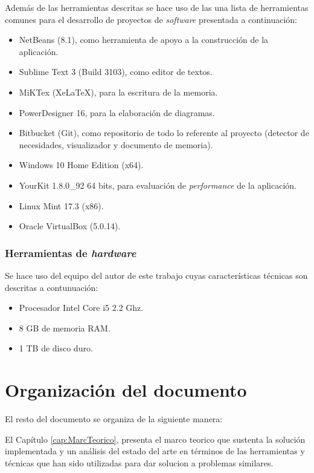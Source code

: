 Además de las herramientas descritas se hace uso de las una lista de herramientas comunes para el desarrollo de proyectos de \textit{software} presentada a continuación:

\begin{itemize}
\item NetBeans (8.1), como herramienta de apoyo a la construcción de la aplicación.
\item Sublime Text 3 (Build 3103), como editor de textos.
\item MiKTex (XeLaTeX), para la escritura de la memoria.
\item PowerDesigner 16, para la elaboración de diagramas.
\item Bitbucket (Git), como repositorio de todo lo referente al proyecto (detector de necesidades, visualizador y documento de memoria).
\item Windows 10 Home Edition (x64).
\item YourKit 1.8.0\_92 64 bits, para evaluación de \textit{performance} de la aplicación.
\item Linux Mint 17.3 (x86).
\item Oracle VirtualBox (5.0.14).
\end{itemize}

\subsubsection*{Herramientas de \textit{hardware}}
\label{subsubsec:HerrHardw}

Se hace uso del equipo del autor de este trabajo cuyas características técnicas son descritas a contunuación:
\begin{itemize}
\item Procesador Intel Core i5 2.2 Ghz.
\item 8 GB de memoria RAM.
\item 1 TB de disco duro.
\end{itemize}

\section{Organización del documento}
\label{intro:organizacion}

El resto del documento se organiza de la siguiente manera:

El Capítulo \ref{cap:MarcTeorico}, presenta el marco teorico que sustenta la solución implementada y un análisis del estado del arte en términos de las herramientas y técnicas que han sido utilizadas para dar solucion a problemas similares.

